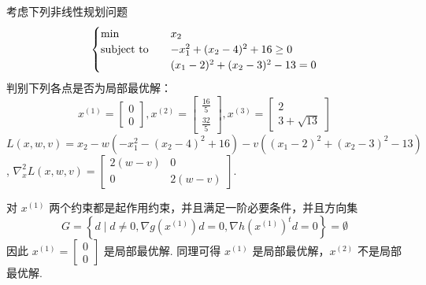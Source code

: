 \begin{problem}[P243 8]
    考虑下列非线性规划问题
    \[\begin{cases}
        \min \quad &x_2\\
        \operatorname{subject\ to} \quad &-x_1^2 + (x_2 - 4)^2 + 16 \ge 0\\
        &(x_1 - 2)^2 + (x_2 - 3)^2 - 13 = 0
    \end{cases}\]
    判别下列各点是否为局部最优解：
    \[x^{(1)} = \begin{bmatrix}
        0\\0
    \end{bmatrix}, x^{(2)} = \begin{bmatrix}
        \frac{16}{5}\\\frac{32}{5}
    \end{bmatrix}, x^{(3)} = \begin{bmatrix}
        2\\3 + \sqrt{13}
    \end{bmatrix}\]
    \Answer $L(x, w, v) = x_2 - w(-x_1^2 - (x_2 - 4)^2 + 16) - v((x_1 - 2)^2 + (x_2 - 3)^2 - 13)$, $\nabla^2_xL(x, w, v) = \begin{bmatrix}
        2(w - v) & 0 \\ 0 & 2(w - v)
    \end{bmatrix}$.

    对 $x^{(1)}$ 两个约束都是起作用约束，并且满足一阶必要条件，并且方向集 \[G = \left\{d \mid d \neq 0, \nabla g(x^{(1)}) d = 0, \nabla h(x^{(1)})^td = 0\right\} = \emptyset\]因此 $x^{(1)} = \begin{bmatrix}
        0 \\ 0
    \end{bmatrix}$ 是局部最优解. 同理可得 $x^{(1)}$ 是局部最优解，$x^{(2)}$ 不是局部最优解.
\end{problem}

